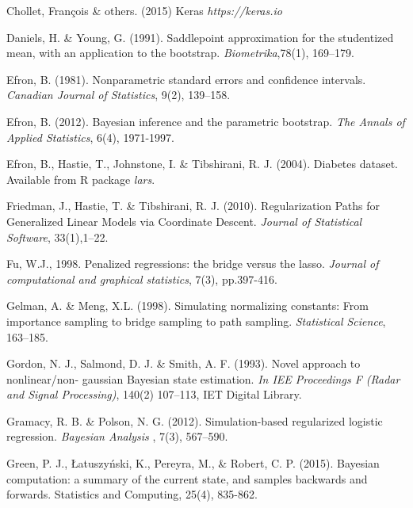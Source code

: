 \documentclass[12pt]{TD-CJS}
\begin{document}
\begin{thebibliography}{}
Chollet, Fran\c{c}ois \& others. (2015) Keras {\it https://keras.io}

Daniels, H. \& Young, G.  (1991). Saddlepoint approximation for the studentized mean, with an application to the bootstrap. {\it Biometrika},78(1), 169--179.

Efron, B. (1981). Nonparametric standard errors and confidence intervals. {\it Canadian Journal of Statistics}, 9(2), 139--158.

Efron, B. (2012). Bayesian inference and the parametric bootstrap. {\it The Annals of Applied Statistics}, 6(4), 1971-1997.

Efron, B., Hastie, T., Johnstone, I. \& Tibshirani, R. J. (2004).  Diabetes dataset. Available from R package {\it lars}.

Friedman, J.,  Hastie, T. \&  Tibshirani, R. J. (2010). Regularization Paths for Generalized Linear Models via Coordinate Descent. {\it Journal of Statistical Software}, 33(1),1--22.

Fu, W.J., 1998. Penalized regressions: the bridge versus the lasso. {\it Journal of computational and graphical statistics}, 
 7(3), pp.397-416.

Gelman, A. \& Meng, X.L. (1998). Simulating normalizing constants: From importance sampling to bridge sampling to path sampling. {\it Statistical Science}, 163--185.

Gordon, N. J.,  Salmond, D. J. \&  Smith, A. F. (1993). Novel approach to nonlinear/non- gaussian Bayesian state estimation. {\it In IEE Proceedings F (Radar and Signal Processing)}, 140(2) 107--113, IET Digital Library.

Gramacy, R. B. \& Polson, N. G. (2012). Simulation-based regularized logistic regression. {\it Bayesian Analysis }, 7(3), 567--590.

Green, P. J., {\L}atuszy{\'n}ski, K., Pereyra, M., \& Robert, C. P. (2015). Bayesian computation: a summary of the current state, and samples backwards and forwards. Statistics and Computing, 25(4), 835-862.


\end{thebibliography}
\end{document}
